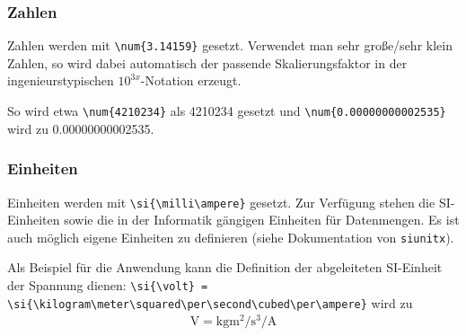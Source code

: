 			\subsubsection{Zahlen}
				Zahlen werden mit \lstinline|\num{3.14159}| gesetzt.
				Verwendet man sehr große/sehr klein Zahlen, so wird dabei automatisch der passende Skalierungsfaktor in der ingenieurstypischen $10^{3x}$-Notation erzeugt.
				\begin{vorlagenbeispiel}
					So wird etwa \lstinline|\num{4210234}| als \num{4210234} gesetzt und \lstinline|\num{0.00000000002535}| wird zu \num{0.00000000002535}.
				\end{vorlagenbeispiel}
				\medskip
				
				\noindent{}
	
			\subsubsection{Einheiten}
				Einheiten werden mit \lstinline|\si{\milli\ampere}| gesetzt.
				Zur Verfügung stehen die SI-Einheiten sowie die in der Informatik gängigen Einheiten für Datenmengen.
				Es ist auch möglich eigene Einheiten zu definieren (siehe Dokumentation von \lstinline|siunitx|).
				
				\begin{vorlagenbeispiel}
					Als Beispiel für die Anwendung kann die Definition der abgeleiteten SI-Einheit der Spannung dienen: \lstinline|\si{\volt} = \si{\kilogram\meter\squared\per\second\cubed\per\ampere}| wird zu
					\begin{align}
						\si{\volt} = \si{\kilogram\meter\squared\per\second\cubed\per\ampere}
					\end{align}
				\end{vorlagenbeispiel}
				
